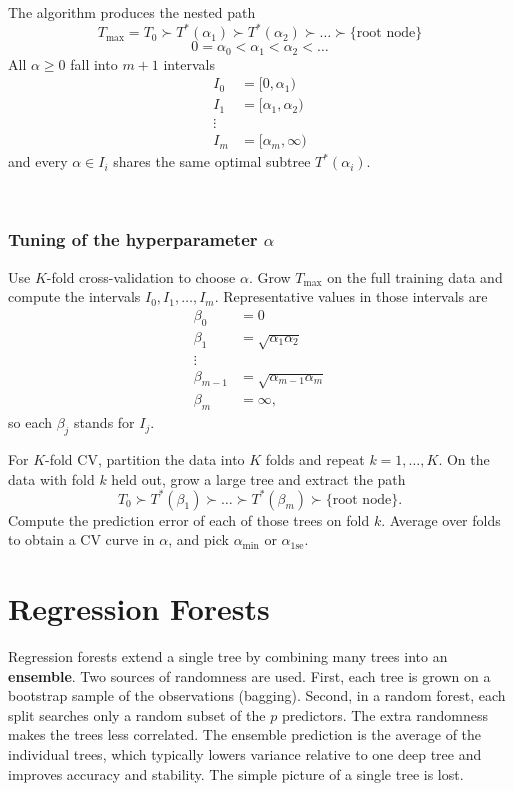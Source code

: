 \documentclass[
]{book}
\begin{document}
The algorithm produces the nested path
\[ T_{\max} = T_0 \succ T^{*}(\alpha_1) \succ T^{*}(\alpha_2) \succ \ldots \succ \{\text{root node}\}\]
\[0=\alpha_0 <\alpha_1 <\alpha_2 < \ldots\]
All \(\alpha \ge 0\) fall into \(m+1\) intervals
\begin{align*}
I_0 &= [0, \alpha_1)\\
I_1 &= [\alpha_1, \alpha_2)\\
\vdots &\\
I_m &= [\alpha_m, \infty)
\end{align*}
and every \(\alpha \in I_i\) shares the same optimal subtree \(T^{*}(\alpha_i)\).

~~

\subsubsection*{\texorpdfstring{Tuning of the hyperparameter \(\alpha\)}{Tuning of the hyperparameter \textbackslash alpha}}\label{tuning-of-the-hyperparameter-alpha}

Use \(K\)-fold cross-validation to choose \(\alpha\). Grow \(T_{\max}\) on the full training data and compute the intervals \(I_0, I_1, \ldots, I_m\). Representative values in those intervals are
\begin{align*}
\beta_0 &= 0\\
\beta_1 &= \sqrt{\alpha_1 \alpha_2}\\
\vdots &\\
\beta_{m-1} &= \sqrt{\alpha_{m-1} \alpha_m}\\
\beta_m &= \infty,
\end{align*}
so each \(\beta_j\) stands for \(I_j\).

For \(K\)-fold CV, partition the data into \(K\) folds and repeat \(k=1, \ldots, K\). On the data with fold \(k\) held out, grow a large tree and extract the path
\[T_0 \succ T^{*}(\beta_1) \succ \ldots  \succ T^{*}(\beta_m) \succ \{\text{root node} \}.\]
Compute the prediction error of each of those trees on fold \(k\). Average over folds to obtain a CV curve in \(\alpha\), and pick \(\alpha_{\min}\) or \(\alpha_{1\mathrm{se}}\).

\section{Regression Forests}\label{regression-forests}

Regression forests extend a single tree by combining many trees into an \textbf{ensemble}. Two sources of randomness are used. First, each tree is grown on a bootstrap sample of the observations (bagging). Second, in a random forest, each split searches only a random subset of the \(p\) predictors. The extra randomness makes the trees less correlated. The ensemble prediction is the average of the individual trees, which typically lowers variance relative to one deep tree and improves accuracy and stability. The simple picture of a single tree is lost.
\end{document}

